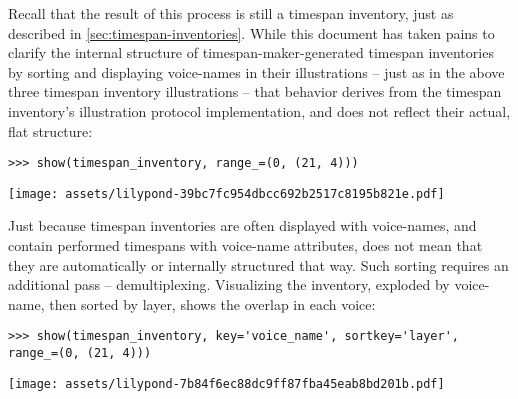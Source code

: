 \noindent Recall that the result of this process is still a timespan inventory,
just as described in \autoref{sec:timespan-inventories}. While this document
has taken pains to clarify the internal structure of timespan-maker-generated
timespan inventories by sorting and displaying voice-names in their
illustrations -- just as in the above three timespan inventory illustrations --
that behavior derives from the timespan inventory's illustration protocol
implementation, and does not reflect their actual, flat structure:

\begin{comment}
<abjad>
show(timespan_inventory, range_=(0, (21, 4)))
</abjad>
\end{comment}

\begin{abjadbookoutput}
\begin{singlespacing}
\vspace{-0.5\baselineskip}
\begin{lstlisting}
>>> show(timespan_inventory, range_=(0, (21, 4)))
\end{lstlisting}
\noindent\texttt{[image: assets/lilypond-39bc7fc954dbcc692b2517c8195b821e.pdf]}
\end{singlespacing}
\end{abjadbookoutput}

\noindent Just because timespan inventories are often displayed with
voice-names, and contain performed timespans with voice-name attributes, does
not mean that they are automatically or internally structured that way. Such
sorting requires an additional pass -- demultiplexing. Visualizing the
inventory, exploded by voice-name, then sorted by layer, shows the overlap in
each voice:

\begin{comment}
<abjad>
show(timespan_inventory, key='voice_name', sortkey='layer', range_=(0, (21, 4)))
</abjad>
\end{comment}

\begin{abjadbookoutput}
\begin{singlespacing}
\vspace{-0.5\baselineskip}
\begin{lstlisting}
>>> show(timespan_inventory, key='voice_name', sortkey='layer', range_=(0, (21, 4)))
\end{lstlisting}
\noindent\texttt{[image: assets/lilypond-7b84f6ec88dc9ff87fba45eab8bd201b.pdf]}
\end{singlespacing}
\end{abjadbookoutput}

